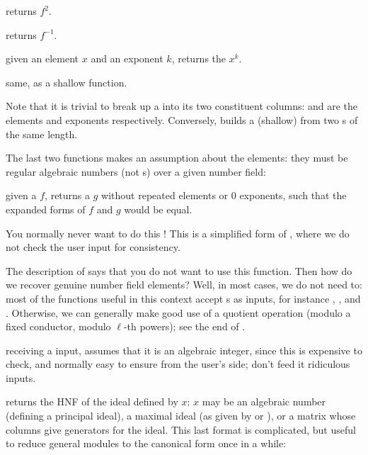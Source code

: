  returns $f^2$.

 returns $f^{-1}$.

 given an element $x$ and an exponent
$k$, returns the  $x^k$.

 same, as a shallow function.

Note that it is trivial to break up a  into its two constituent
columns:  and  are the elements and exponents
respectively. Conversely,  builds a (shallow)  from
two s of the same length.

The last two functions makes an assumption about the elements: they must be
regular algebraic numbers (not s) over a given number field:

 given a  $f$, returns a 
$g$ without repeated elements or 0 exponents, such that the expanded forms
of $f$ and $g$ would be equal.

 You normally never want to do this !
This is a simplified form of , where we do not check the
user input for consistency.

The description of  says that you do not want to use this
function. Then how do we recover genuine number field elements? Well, in
most cases, we do not need to: most of the functions useful in this
context accept s as inputs, for instance ,
,  and . Otherwise, we can
generally make good use of a quotient operation (modulo a fixed conductor,
modulo $\ell$-th powers); see the end of .

 receiving a  input,  assumes that
it is an algebraic integer, since this is expensive to check, and normally
easy to ensure from the user's side; don't feed it ridiculous inputs.



 returns the HNF of the ideal defined by $x$:
$x$ may be an algebraic  number (defining a principal ideal),  a maximal ideal
(as given by  or  ), or a matrix whose
columns give generators for the  ideal. This  last format is complicated,  but
useful to reduce general modules to the canonical form once in a while:

